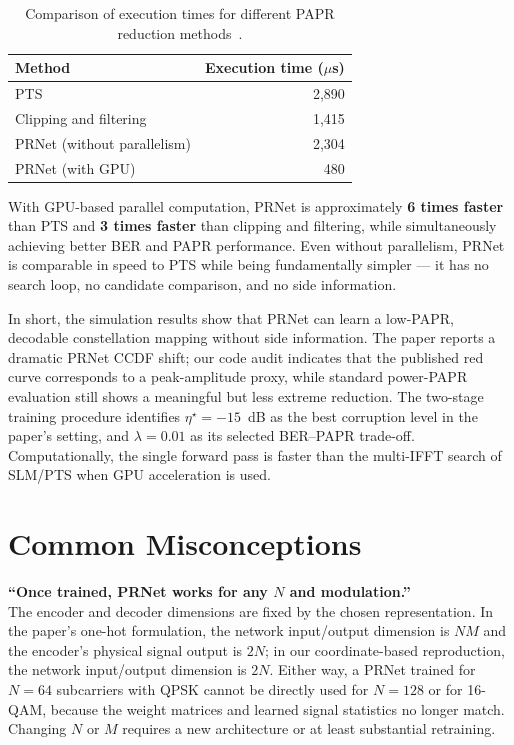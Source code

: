 \begin{table}[H]
    \centering
    \caption{Comparison of execution times for different PAPR reduction
             methods~\cite{kim2017novel}.}
    \label{tab:prnet_timing}
    \begin{tabular}{@{} l r @{}}
        \toprule
        \textbf{Method} & \textbf{Execution time ($\mu$s)} \\
        \midrule
        PTS                         & 2{,}890 \\
        Clipping and filtering      & 1{,}415 \\
        PRNet (without parallelism) & 2{,}304 \\
        PRNet (with GPU)            & 480 \\
        \bottomrule
    \end{tabular}
\end{table}

With GPU-based parallel computation, PRNet is approximately \textbf{6 times
faster} than PTS and \textbf{3 times faster} than clipping and filtering,
while simultaneously achieving better BER and PAPR performance.  Even
without parallelism, PRNet is comparable in speed to PTS while being
fundamentally simpler --- it has no search loop, no candidate comparison,
and no side information.

In short, the simulation results show that PRNet can learn a low-PAPR,
decodable constellation mapping without side information.  The paper reports
a dramatic PRNet CCDF shift; our code audit indicates that the published red
curve corresponds to a peak-amplitude proxy, while standard power-PAPR
evaluation still shows a meaningful but less extreme reduction.  The
two-stage training procedure identifies $\eta^\star = -15$~dB as the best
corruption level in the paper's setting, and $\lambda = 0.01$ as its selected
BER--PAPR trade-off.  Computationally, the single forward pass is faster than
the multi-IFFT search of SLM/PTS when GPU acceleration is used.


\section{Common Misconceptions}
\label{sec:prnet_misconceptions}

\begin{misconception}
    \textbf{``Once trained, PRNet works for any $N$ and modulation.''} \\
    The encoder and decoder dimensions are fixed by the chosen representation.
    In the paper's one-hot formulation, the network input/output dimension is
    $NM$ and the encoder's physical signal output is $2N$; in our
    coordinate-based reproduction, the network input/output dimension is
    $2N$.  Either way, a PRNet trained for $N = 64$ subcarriers with QPSK
    cannot be directly used for $N = 128$ or for 16-QAM, because the weight
    matrices and learned signal statistics no longer match.  Changing $N$ or
    $M$ requires a new architecture or at least substantial retraining.
\end{misconception}

